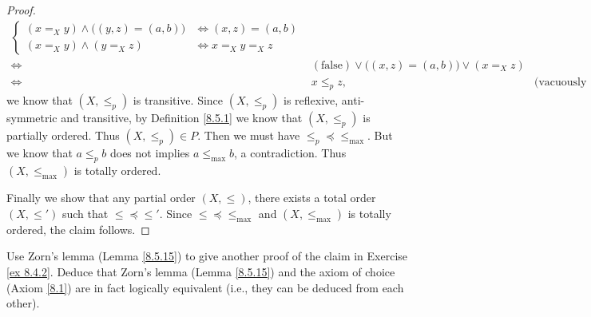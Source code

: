\begin{proof}
\begin{align*}
\begin{cases}
                   (x =_X y) \land \big((y, z) = (a, b)\big)                 & \iff (x, z) = (a, b) \\
                   (x =_X y) \land (y =_X z)                                 & \iff x =_X y =_X z
               \end{cases}                              \\
        \iff & (\text{false}) \lor \big((x, z) = (a, b)\big) \lor (x =_X z)                                                  \\
        \iff & x \leq_p z,                                                                         & \text{(vacuously true)}
    \end{align*}
    we know that \((X, \leq_p)\) is transitive.
    Since \((X, \leq_p)\) is reflexive, anti-symmetric and transitive, by Definition \ref{8.5.1} we know that \((X, \leq_p)\) is partially ordered.
    Thus \((X, \leq_p) \in P\).
    Then we must have \(\leq_p \preceq \leq_{\max}\).
    But we know that \(a \leq_p b\) does not implies \(a \leq_{\max} b\), a contradiction.
    Thus \((X, \leq_{\max})\) is totally ordered.

    Finally we show that any partial order \((X, \leq)\), there exists a total order \((X, \leq')\) such that \(\leq \preceq \leq'\).
    Since \(\leq \preceq \leq_{\max}\) and \((X, \leq_{\max})\) is totally ordered, the claim follows.
\end{proof}

\begin{exercise}\label{ex 8.5.17}
    Use Zorn's lemma (Lemma \ref{8.5.15}) to give another proof of the claim in Exercise \ref{ex 8.4.2}.
    Deduce that Zorn's lemma (Lemma \ref{8.5.15}) and the axiom of choice (Axiom \ref{8.1}) are in fact logically equivalent
    (i.e., they can be deduced from each other).
\end{exercise}

